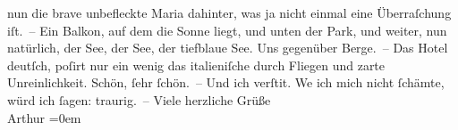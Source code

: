 \begin{ledgroupsized}[t]{13cm}
               nun die brave unbefleckte Maria dahinter, was ja nicht einmal eine Überraſchung
               iſt. – Ein Balkon, auf dem die Sonne liegt, und unten der Park, und weiter, nun
               natürlich, der See, der See,
               der tiefblaue See. Uns
               gegenüber Berge. – Das Hotel deutſch, poſirt nur ein wenig das italieniſche durch Fliegen und zarte Unreinlichkeit. Schön, ſehr
               ſchön. – Und ich verſti{\geminationm}t. We{\geminationn} ich mich nicht ſchämte, würd ich ſagen: traurig. –\pend
           \pstart
           Viele herzliche Grüße{\\[\baselineskip]}\spacefill\mbox{Arthur}\pend
           \leftskip=0em{}
         
         \endnumbering{}\end{ledgroupsized}  \newcommand{\dateiname}{L00123}\newcommand{\titel}{Arthur Schnitzler an Richard Beer-Hofmann, 13. 9. 1892}\newcommand{\editorInnen}{Martin Anton Müller und Gerd-Hermann Susen}
      